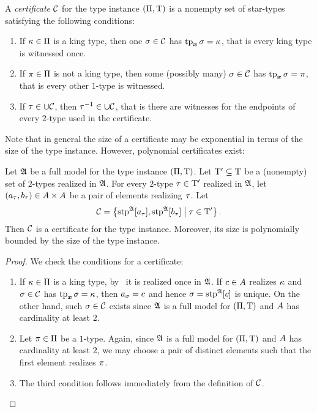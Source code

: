 \begin{definition}
A \emph{certificate} $\mathcal{C}$ for the type instance $(\Pi,\mathrm{T})$ is a
nonempty set of star-types satisfying the following conditions:
\begin{enumerate}
  \item If $\kappa \in \Pi$ is a king type, then one $\sigma \in \mathcal{C}$ has
  $\operatorname{tp}_{\bm{x}}\sigma = \kappa$, that is every king type is witnessed once.
  \item If $\pi \in \Pi$ is not a king type, then some (possibly many)
  $\sigma \in \mathcal{C}$ has $\operatorname{tp}_{\bm{x}}\sigma = \pi$, that is every other $1$-type is
  witnessed.
  \item If $\tau \in \cup\mathcal{C}$, then $\tau^{-1} \in \cup\mathcal{C}$, that is there
  are witnesses for the endpoints of every $2$-type used in the certificate.
\end{enumerate}
\end{definition}
Note that in general the size of a certificate may be exponential in terms of
the size of the type instance. However, polynomial certificates exist:
\begin{remark}
Let $\mathfrak{A}$ be a full model for the type instance $(\Pi,\mathrm{T})$.
Let ${\mathrm{T}'} \subseteq \mathrm{T}$ be a (nonempty) set of $2$-types realized in
$\mathfrak{A}$.
For every $2$-type $\tau \in {\mathrm{T}'}$ realized in $\mathfrak{A}$, let $(a_\tau,
b_\tau) \in A\times A$ be a pair of elements realizing $\tau$.
Let 
\[
  \mathcal{C} = \left\{\operatorname{stp}^{\mathfrak{A}}[a_\tau], \operatorname{stp}^{\mathfrak{A}}[b_\tau]\mathrel{}\middle|\mathrel{}\tau \in
  {\mathrm{T}'}\right\}.
\]
Then $\mathcal{C}$ is a certificate for the type instance. Moreover, its size is
polynomially bounded by the size of the type instance.
\end{remark}
\begin{proof}
We check the conditions for a certificate:
\begin{enumerate}
  \item If $\kappa \in \Pi$ is a king type, by~ it
  is realized once in $\mathfrak{A}$. If $c \in A$ realizes $\kappa$ and $\sigma
  \in \mathcal{C}$ has $\operatorname{tp}_{\bm{x}}\sigma = \kappa$, then $a_\sigma = c$ and hence
  $\sigma = \operatorname{stp}^{\mathfrak{A}}[c]$ is unique. On the other hand, such $\sigma \in \mathcal{C}$
  exists since $\mathfrak{A}$ is a full model for $(\Pi,\mathrm{T})$ and $A$ has
  cardinality at least $2$.
  \item Let $\pi \in \Pi$ be a $1$-type. Again, since $\mathfrak{A}$ is a full
  model for $(\Pi,\mathrm{T})$ and $A$ has cardinality at least $2$, we may
  choose a pair of distinct elements such that the first element realizes
  $\pi$.
  \item The third condition follows immediately from the definition of $\mathcal{C}$.
\end{enumerate}
\end{proof}

